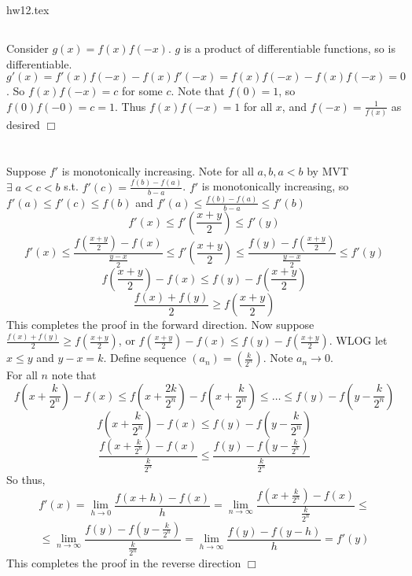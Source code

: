 hw12.tex\documentclass{article}
\begin{document}
\subsection{}
Consider $g(x) = f(x)f(-x)$. $g$ is a product of differentiable functions, so is differentiable. $g'(x) = f'(x)f(-x) - f(x)f'(-x) = f(x)f(-x) - f(x)f(-x) = 0$. So $f(x)f(-x) = c$ for some $c$. Note that $f(0) = 1$, so $f(0)f(-0) = c = 1$. Thus $f(x)f(-x) = 1$ for all $x$, and $f(-x) = \frac{1}{f(x)}$ as desired $\Box$

\section{}
Suppose $f'$ is monotonically increasing. Note for all $a,b,a<b$ by MVT $\exists \; a<c<b$ s.t. $f'(c) = \frac{f(b) - f(a)}{b-a}$. $f'$ is monotonically increasing, so $f'(a)\leq f'(c) \leq f(b)$ and $f'(a) \leq \frac{f(b)-f(a)}{b-a} \leq f'(b)$
$$f'(x) \leq f'\left(\frac{x+y}{2}\right) \leq f'(y)$$
$$f'(x) \leq \frac{f\left(\frac{x+y}{2}\right) - f(x)}{\frac{y-x}{2}} \leq f'\left(\frac{x+y}{2}\right) \leq \frac{f(y) - f\left(\frac{x+y}{2}\right)}{\frac{y-x}{2}} \leq f'(y)$$
$$f\left(\frac{x+y}{2}\right)-f(x) \leq f(y) - f\left(\frac{x+y}{2}\right)$$
$$\frac{f(x)+f(y)}{2}\geq f\left(\frac{x+y}{2}\right)$$
This completes the proof in the forward direction.
Now suppose $\frac{f(x)+f(y)}{2}\geq f\left(\frac{x+y}{2}\right)$, or $f\left(\frac{x+y}{2}\right)-f(x) \leq f(y) - f\left(\frac{x+y}{2}\right)$. WLOG let $x\leq y$ and $y-x = k$. Define sequence $(a_n) = (\frac{k}{2^n})$. Note $a_n \rightarrow 0$.\\
For all $n$ note that
$$f\left( x + \frac{k}{2^n}\right) - f(x) \leq f\left( x + \frac{2k}{2^n}\right)- f\left(x + \frac{k}{2^n}\right) \leq \dots \leq f(y) - f\left(y - \frac{k}{2^n}\right)$$
$$f\left( x + \frac{k}{2^n}\right) - f(x) \leq f(y) - f\left(y - \frac{k}{2^n}\right)$$
$$\frac{f\left( x + \frac{k}{2^n}\right) - f(x)}{\frac{k}{2^n}} \leq \frac{f(y) - f\left(y - \frac{k}{2^n}\right)}{\frac{k}{2^n}}$$
So thus,
$$f'(x) = \lim\limits_{h\rightarrow0} \frac{f(x+h) - f(x)}{h} = \lim\limits_{n\rightarrow\infty} \frac{f\left( x + \frac{k}{2^n}\right) - f(x)}{\frac{k}{2^n}} \leq$$
$$\leq \lim\limits_{n\rightarrow\infty}\frac{f(y) - f\left(y - \frac{k}{2^n}\right)}{\frac{k}{2^n}}= \lim\limits_{h\rightarrow\infty} \frac{f(y)-f(y-h)}{h} = f'(y)$$
This completes the proof in the reverse direction $\Box$
\end{document}
